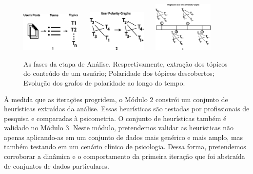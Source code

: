 \documentclass[11pt, notitlepage]{article} %
\newcommand{\rulesep}{\unskip\ \vrule\ }
\begin{document}
\begin{figure}
  \centering
      \includegraphics[trim=0 31 0 0, clip, width=0.265\textwidth]{Figures/method_1.eps} \hfill
      \rulesep
      \includegraphics[trim=0 31 0 0, clip, width=0.265\textwidth]{Figures/method_2.eps} \hfill
      \rulesep
      \includegraphics[trim=0 31 0 65, clip, width=0.265\textwidth]{Figures/method_3.eps} 

      \caption{As fases da etapa de Análise. Respectivamente, extração dos tópicos do conteúdo de um usuário; Polaridade dos tópicos descobertos; Evolução dos grafos de polaridade ao longo do tempo.}
      \label{fig:parsing_stage}
\end{figure}

À medida que as iterações progridem, o Módulo 2 constrói um conjunto de heurísticas extraídas da análise. Essas heurísticas são testadas por profissionais de pesquisa e comparadas à psicometria.
O conjunto de heurísticas também é validado no Módulo 3. Neste módulo, pretendemos validar as heurísticas não apenas aplicando-as em um conjunto de dados mais genérico e mais amplo, mas também testando em um cenário clínico de psicologia. Dessa forma, pretendemos corroborar a dinâmica e o comportamento da primeira iteração que foi abstraída de conjuntos de dados particulares.
\end{document}
